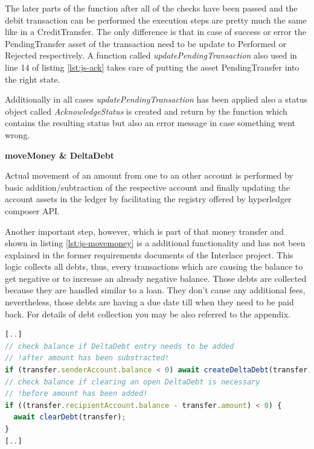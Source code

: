 The later parts of the function after all of the checks have been passed and the debit transaction can be performed the execution steps are pretty much the same like in a CreditTransfer. The only difference is that in case of success or error the PendingTransfer asset of the transaction need to be update to Performed or Rejected respectively. A function called \textit{updatePendingTransaction} also used in line 14 of listing \ref{lst:js-ack} takes care of putting the asset PendingTransfer into the right state.

Additionally in all cases \textit{updatePendingTransaction} has been applied also a status object called \textit{AcknowledgeStatus} is created and return by the function which contains the resulting status but also an error message in case something went wrong.

\textbf{moveMoney \& DeltaDebt}

Actual movement of an amount from one to an other account is performed by basic addition/subtraction of the respective account and finally updating the account assets in the ledger by facilitating the registry offered by hyperledger composer API.

Another important step, however, which is part of that money transfer and shown in listing \ref{lst:js-movemoney} is a additional functionality and has not been explained in the former requirements documents of the Interlace project. This logic collects all debts, thus, every transactions which are causing the balance to get negative or to increase an already negative balance. Those debts are collected because they are handled similar to a loan. They don't cause any additional fees, nevertheless, those debts are having a due date till when they need to be paid back. For details of debt collection you may be also referred to the appendix.

\begin{center}
\begin{minipage}{0.8\textwidth}
\small
\begin{lstlisting}[language=javascript,firstnumber=1,caption={\bf\small moveMoney JavaScript excerpt}, captionpos=b,label=lst:js-movemoney]
[..]
// check balance if DeltaDebt entry needs to be added
// !after amount has been substracted!
if (transfer.senderAccount.balance < 0) await createDeltaDebt(transfer);
// check balance if clearing an open DeltaDebt is necessary
// !before amount has been added!
if ((transfer.recipientAccount.balance - transfer.amount) < 0) {
  await clearDebt(transfer);
}
[..]
\end{lstlisting}
\end{minipage}
\end{center}

